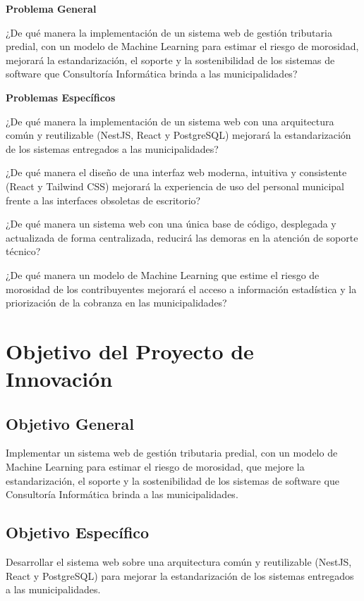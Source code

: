\documentclass[12pt,a4paper]{report}
\newcommand{\subtitulo}[1]{\par\vspace{4pt}\noindent\textbf{#1}\par}
\begin{document}
\subtitulo{Problema General}

¿De qué manera la implementación de un sistema web de gestión tributaria predial, con un modelo de Machine Learning para estimar el riesgo de morosidad, mejorará la estandarización, el soporte y la sostenibilidad de los sistemas de software que Consultoría Informática brinda a las municipalidades?

\subtitulo{Problemas Específicos}

¿De qué manera la implementación de un sistema web con una arquitectura común y reutilizable (NestJS, React y PostgreSQL) mejorará la estandarización de los sistemas entregados a las municipalidades?

¿De qué manera el diseño de una interfaz web moderna, intuitiva y consistente (React y Tailwind CSS) mejorará la experiencia de uso del personal municipal frente a las interfaces obsoletas de escritorio?

¿De qué manera un sistema web con una única base de código, desplegada y actualizada de forma centralizada, reducirá las demoras en la atención de soporte técnico?

¿De qué manera un modelo de Machine Learning que estime el riesgo de morosidad de los contribuyentes mejorará el acceso a información estadística y la priorización de la cobranza en las municipalidades?

\section{Objetivo del Proyecto de Innovación}

\subsection{Objetivo General}

Implementar un sistema web de gestión tributaria predial, con un modelo de Machine Learning para estimar el riesgo de morosidad, que mejore la estandarización, el soporte y la sostenibilidad de los sistemas de software que Consultoría Informática brinda a las municipalidades.

\subsection{Objetivo Específico}

Desarrollar el sistema web sobre una arquitectura común y reutilizable (NestJS, React y PostgreSQL) para mejorar la estandarización de los sistemas entregados a las municipalidades.
\end{document}
